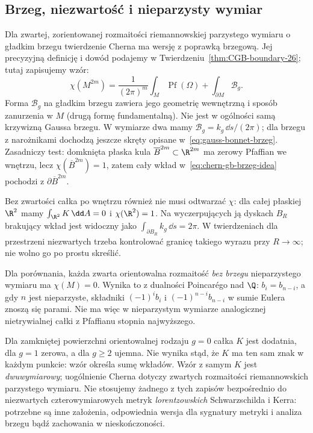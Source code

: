 \subsection*{Brzeg, niezwartość i nieparzysty wymiar}

Dla zwartej, zorientowanej rozmaitości riemannowskiej
parzystego wymiaru o gładkim brzegu twierdzenie Cherna
ma wersję z poprawką brzegową. Jej precyzyjną definicję
i dowód podajemy w
Twierdzeniu~\ref{thm:CGB-boundary-26}; tutaj zapisujemy wzór:
\begin{equation}\label{eq:chern-gb-brzeg-idea}
 \chi(M^{2m})=
 \frac1{(2\pi)^m}\int_M\operatorname{Pf}(\Omega)
 +\int_{\partial M}\mathcal B_g.
\end{equation}
Forma $\mathcal B_g$ na gładkim brzegu zawiera jego
geometrię wewnętrzną i sposób zanurzenia w $M$
(drugą formę fundamentalną). Nie jest w ogólności
samą krzywizną Gaussa brzegu. W wymiarze dwa mamy
$\mathcal B_g=k_g\,\dd s/(2\pi)$; dla brzegu
z narożnikami dochodzą jeszcze skręty opisane
w~\eqref{eq:gauss-bonnet-brzeg}. Zasadniczy test:
domknięta płaska kula $\overline B^{2m}\subset\R^{2m}$
ma zerowy Pfaffian we wnętrzu, lecz $\chi(\overline B^{2m})=1$,
zatem cały wkład w~\eqref{eq:chern-gb-brzeg-idea}
pochodzi z $\partial\overline B^{2m}$.

Bez zwartości całka po wnętrzu również nie musi
odtwarzać $\chi$: dla całej płaskiej $\R^2$
mamy $\int_{\R^2}K\,\dd A=0$ i $\chi(\R^2)=1$.
Na wyczerpujących ją dyskach $B_R$ brakujący wkład
jest widoczny jako $\int_{\partial B_R}k_g\,\dd s=2\pi$.
W twierdzeniach dla przestrzeni niezwartych trzeba
kontrolować granicę takiego wyrazu przy $R\to\infty$;
nie wolno go po prostu skreślić.

Dla porównania, każda zwarta orientowalna rozmaitość
\emph{bez brzegu} nieparzystego wymiaru ma $\chi(M)=0$.
Wynika to z dualności Poincarégo nad $\Q$:
$b_i=b_{n-i}$, a gdy $n$ jest nieparzyste,
składniki $(-1)^i b_i$ i $(-1)^{n-i}b_{n-i}$
w sumie Eulera znoszą się parami. Nie ma więc
w nieparzystym wymiarze analogicznej nietrywialnej
całki z Pfaffianu stopnia najwyższego.

\begin{uwaga}
Dla zamkniętej powierzchni orientowalnej rodzaju $g=0$
całka $K$ jest dodatnia, dla $g=1$ zerowa, a dla
$g\geq2$ ujemna. Nie wynika stąd, że $K$ ma ten sam
znak w każdym punkcie: wzór określa sumę wkładów.
Wzór z samym $K$ jest \emph{dwuwymiarowy};
uogólnienie Cherna dotyczy zwartych rozmaitości
riemannowskich parzystego wymiaru. Nie stosujemy
żadnego z tych zapisów bezpośrednio do niezwartych
czterowymiarowych metryk \emph{lorentzowskich}
Schwarzschilda i Kerra: potrzebne są inne założenia,
odpowiednia wersja dla sygnatury metryki i analiza brzegu
bądź zachowania w nieskończoności.
\end{uwaga}

